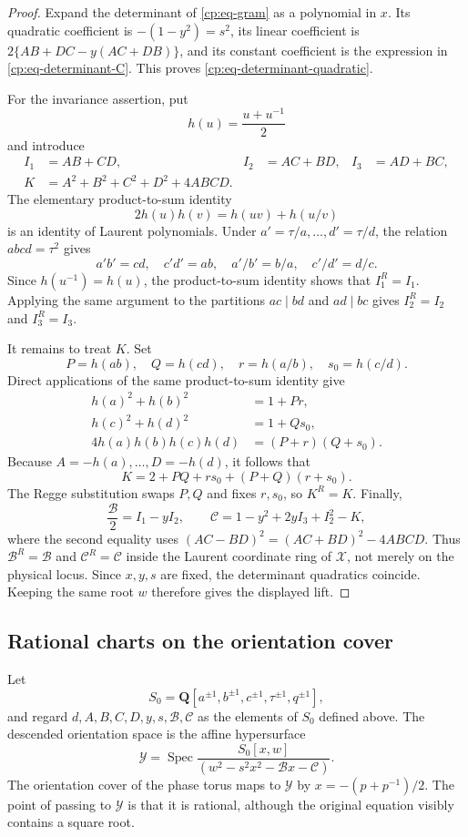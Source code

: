 \begin{proof}
Expand the determinant of \eqref{cp:eq-gram} as a polynomial
in \(x\).  Its quadratic coefficient is
\(-(1-y^2)=s^2\), its linear coefficient is
\(2\{AB+DC-y(AC+DB)\}\), and its constant coefficient is the expression in
\eqref{cp:eq-determinant-C}.  This proves
\eqref{cp:eq-determinant-quadratic}.

For the invariance assertion, put
\[
 h(u)=\frac{u+u^{-1}}2
\]
and introduce
\begin{align*}
 I_1&=AB+CD,& I_2&=AC+BD,& I_3&=AD+BC,\\
 K&=A^2+B^2+C^2+D^2+4ABCD.
\end{align*}
The elementary product-to-sum identity
\[
 2h(u)h(v)=h(uv)+h(u/v)
\]
is an identity of Laurent polynomials.  Under
\(a'=\tau/a,\ldots,d'=\tau/d\), the relation \(abcd=\tau^2\) gives
\[
 a'b'=cd,\quad c'd'=ab,\quad
 a'/b'=b/a,\quad c'/d'=d/c.
\]
Since \(h(u^{-1})=h(u)\), the product-to-sum identity shows that
\(I_1^R=I_1\).  Applying the same argument to the partitions
\(ac\mid bd\) and \(ad\mid bc\) gives \(I_2^R=I_2\) and \(I_3^R=I_3\).

It remains to treat \(K\).  Set
\[
 P=h(ab),\quad Q=h(cd),\quad r=h(a/b),\quad s_0=h(c/d).
\]
Direct applications of the same product-to-sum identity give
\[
\begin{aligned}
 h(a)^2+h(b)^2&=1+Pr,\\
 h(c)^2+h(d)^2&=1+Qs_0,\\
 4h(a)h(b)h(c)h(d)&=(P+r)(Q+s_0).
\end{aligned}
\]
Because \(A=-h(a),\ldots,D=-h(d)\), it follows that
\[
 K=2+PQ+rs_0+(P+Q)(r+s_0).
\]
The Regge substitution swaps \(P,Q\) and fixes \(r,s_0\), so \(K^R=K\).
Finally,
\[
 \frac{\mathcal B}{2}=I_1-yI_2,\qquad
 \mathcal C=1-y^2+2yI_3+I_2^2-K,
\]
where the second equality uses
\((AC-BD)^2=(AC+BD)^2-4ABCD\).  Thus
\(\mathcal B^R=\mathcal B\) and \(\mathcal C^R=\mathcal C\) inside the
Laurent coordinate ring of \(\mathcal X\), not merely on the physical
locus.  Since \(x,y,s\) are fixed, the determinant quadratics coincide.
Keeping the same root \(w\) therefore gives the displayed lift.
\end{proof}

\subsection{Rational charts on the orientation cover}
\label{cp:subsec-rational-charts}

Let
\[
 S_0=\mathbf Q[a^{\pm1},b^{\pm1},c^{\pm1},
                       \tau^{\pm1},q^{\pm1}],
\]
and regard \(d,A,B,C,D,y,s,\mathcal B,\mathcal C\) as the elements of
\(S_0\) defined above.  The descended orientation space is the affine
hypersurface
\begin{equation}
 \mathcal Y=
 \operatorname{Spec}
 \frac{S_0[x,w]}
      {(w^2-s^2x^2-\mathcal Bx-\mathcal C)}.
 \label{cp:eq-descended-orientation-space}
\end{equation}
The orientation cover of the phase torus maps to \(\mathcal Y\) by
\(x=-(p+p^{-1})/2\).  The point of passing to \(\mathcal Y\) is that it is
rational, although the original equation visibly contains a square root.

